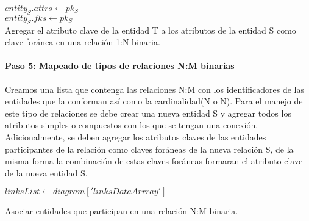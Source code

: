 \begin{algorithm}[H]

    \ForEach{$relation \in relations1\_1:$}{
      \If{$(link['cardinality'] = N :$}{
        $entity_S \gets entiesWithAttrs[relationKey$\\
      }
      \If{$(link['cardinality'] = 1 :$}{
        $entity_T \gets entiesWithAttrs[relationKey$\\
      }
    }
    $entity_S.attrs \gets pk_S$\\
    $entity_S.fks \gets pk_S$\\
  \caption{Agregar el atributo clave de la entidad T a los atributos de la entidad S como clave foránea en una relación 1:N binaria.}
\end{algorithm}

\paragraph*{Paso 5: Mapeado de tipos de relaciones N:M binarias}

Creamos una lista que contenga las relaciones N:M con los identificadores de las entidades que la conforman así como la cardinalidad(N o N). Para el manejo de este tipo de relaciones se debe crear una nueva entidad S y agregar todos los atributos simples o compuestos con los que se tengan una conexión. Adicionalmente, se deben agregar los atributos claves de las entidades participantes de la relación como claves foráneas de la nueva relación S, de la misma forma la combinación de estas claves foráneas formaran el atributo clave de la nueva entidad S.

\begin{algorithm}[H]

  $linksList \gets diagram['linksDataArrray']$\\
  \caption{Asociar entidades que participan en una relación N:M binaria.}
\end{algorithm}

